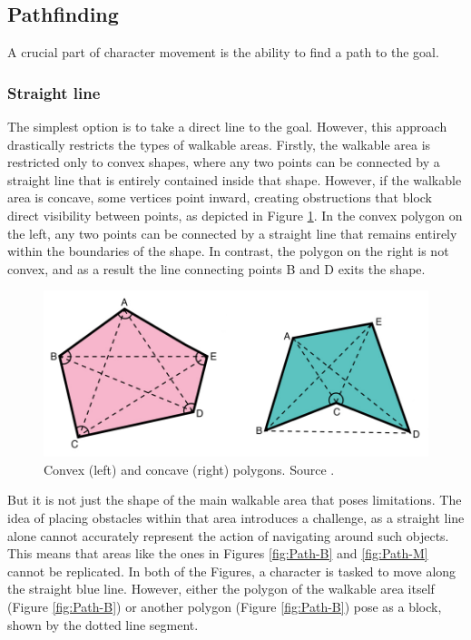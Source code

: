 \subsection{Pathfinding}
A crucial part of character movement is the ability to find a path to the goal.

\subsubsection{Straight line}
The simplest option is to take a direct line to the goal. However, this approach drastically restricts the types of walkable areas. Firstly, the walkable area is restricted only to convex shapes, where any two points can be connected by a straight line that is entirely contained inside that shape. However, if the walkable area is concave, some vertices point inward, creating obstructions that block direct visibility between points, as depicted in Figure \ref{fig:Polygons}. In the convex polygon on the left, any two points can be connected by a straight line that remains entirely within the boundaries of the shape. In contrast, the polygon on the right is not convex, and as a result the line connecting points B and D exits the shape. 

\begin{figure}[H]
\centering
\includegraphics[width=.8\linewidth]{img/polygons.png}
\caption{Convex (left) and concave (right) polygons. Source \cite{Polygons}.}
\label{fig:Polygons}
\end{figure}

But it is not just the shape of the main walkable area that poses limitations. The idea of placing obstacles within that area introduces a challenge, as a straight line alone cannot accurately represent the action of navigating around such objects. This means that areas like the ones in Figures \ref{fig:Path-B}  and \ref{fig:Path-M}  cannot be replicated. In both of the Figures, a character is tasked to move along the straight blue line. However, either the polygon of the walkable area itself (Figure \ref{fig:Path-B}) or another polygon (Figure \ref{fig:Path-B}) pose as a block, shown by the dotted line segment.

